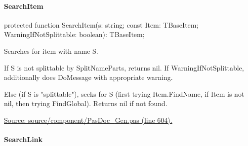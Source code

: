 \documentclass{report}
\newif\ifpdf
\begin{document}
\paragraph*{SearchItem}\hspace*{\fill}

\label{PasDoc_Gen.TDocGenerator-SearchItem}
\begin{list}{}{
\setlength{\itemindent}{0cm}
\setlength{\listparindent}{0cm}
\setlength{\leftmargin}{\evensidemargin}
\addtolength{\leftmargin}{\tmplength}
\settowidth{\labelsep}{X}
\addtolength{\leftmargin}{\labelsep}
\setlength{\labelwidth}{\tmplength}
}
\item[\textbf{Declaration}\hfill]
\ifpdf
\begin{flushleft}
\fi
\begin{ttfamily}
protected function SearchItem(s: string; const Item: TBaseItem; WarningIfNotSplittable: boolean): TBaseItem;\end{ttfamily}

\ifpdf
\end{flushleft}
\fi

\par
\item[\textbf{Description}]
Searches for item with name S.

If S is not splittable by SplitNameParts, returns nil. If WarningIfNotSplittable, additionally does DoMessage with appropriate warning.

Else (if S is "splittable"), seeks for S (first trying Item.FindName, if Item is not nil, then trying FindGlobal). Returns nil if not found.\par
\href{https://github.com/pasdoc/pasdoc/blob/master/source/component/PasDoc_Gen.pas#L604}{Source: source/component/PasDoc{\_}Gen.pas (line 604).}

\end{list}
\paragraph*{SearchLink}\hspace*{\fill}
\end{document}
